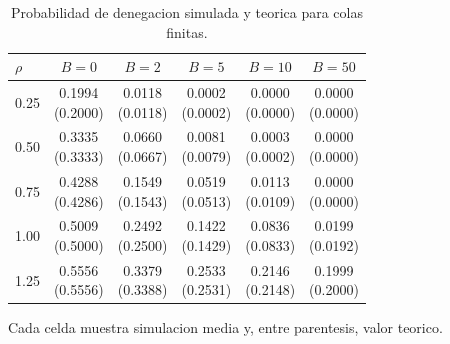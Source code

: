\begin{table}[htbp]
\centering
\caption{Probabilidad de denegacion simulada y teorica para colas finitas.}
\label{tab:mm1-denial-probability}
\begin{tabular}{lccccc}
\toprule
$\rho$ & $B=0$ & $B=2$ & $B=5$ & $B=10$ & $B=50$ \\
\midrule
0.25 & \shortstack{0.1994\\(0.2000)} & \shortstack{0.0118\\(0.0118)} & \shortstack{0.0002\\(0.0002)} & \shortstack{0.0000\\(0.0000)} & \shortstack{0.0000\\(0.0000)} \\
0.50 & \shortstack{0.3335\\(0.3333)} & \shortstack{0.0660\\(0.0667)} & \shortstack{0.0081\\(0.0079)} & \shortstack{0.0003\\(0.0002)} & \shortstack{0.0000\\(0.0000)} \\
0.75 & \shortstack{0.4288\\(0.4286)} & \shortstack{0.1549\\(0.1543)} & \shortstack{0.0519\\(0.0513)} & \shortstack{0.0113\\(0.0109)} & \shortstack{0.0000\\(0.0000)} \\
1.00 & \shortstack{0.5009\\(0.5000)} & \shortstack{0.2492\\(0.2500)} & \shortstack{0.1422\\(0.1429)} & \shortstack{0.0836\\(0.0833)} & \shortstack{0.0199\\(0.0192)} \\
1.25 & \shortstack{0.5556\\(0.5556)} & \shortstack{0.3379\\(0.3388)} & \shortstack{0.2533\\(0.2531)} & \shortstack{0.2146\\(0.2148)} & \shortstack{0.1999\\(0.2000)} \\
\bottomrule
\end{tabular}
\par\smallskip
\begin{minipage}{0.95\linewidth}
\centering\footnotesize
Cada celda muestra simulacion media y, entre parentesis, valor teorico.
\end{minipage}
\end{table}
